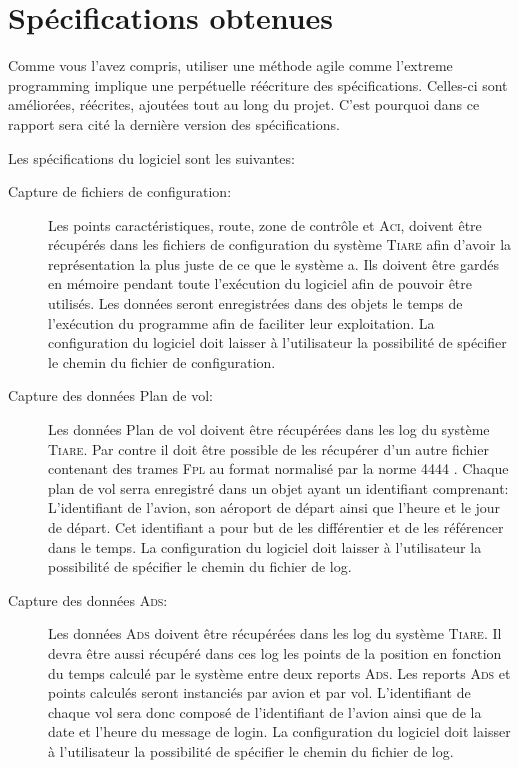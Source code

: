 
\section{Spécifications obtenues}
Comme vous l'avez compris, utiliser une méthode agile comme l'extreme programming  implique une perpétuelle réécriture des spécifications. Celles-ci sont améliorées, réécrites, ajoutées tout au long du projet. C'est pourquoi dans ce rapport sera cité la dernière version des spécifications.

Les spécifications du logiciel sont les suivantes:
\begin{description}
    \item[Capture de fichiers de configuration:] Les points caractéristiques, route, zone de contrôle et \textsc{Aci}, doivent être récupérés dans les fichiers de configuration du système \textsc{Tiare} afin d'avoir la représentation la plus juste de ce que le système a. Ils doivent être gardés en mémoire pendant toute l'exécution du logiciel afin de pouvoir être utilisés. Les données seront enregistrées dans des objets le temps de l'exécution du programme afin de faciliter leur exploitation. La configuration du logiciel doit laisser à l'utilisateur la possibilité de spécifier le chemin du fichier de configuration.

    \item[Capture des données Plan de vol:] Les données Plan de vol doivent être récupérées dans les log du système \textsc{Tiare}. Par contre il doit être possible de les récupérer d'un autre fichier contenant des trames \textsc{Fpl} au format normalisé par la norme 4444 . Chaque plan de vol serra enregistré dans un objet ayant un identifiant comprenant: L'identifiant de l'avion, son aéroport de départ ainsi que l'heure et le jour de départ. Cet identifiant a pour but de les différentier et de les référencer dans le temps. La configuration du logiciel doit laisser à l'utilisateur la possibilité de spécifier le chemin du fichier de log.

    \item[Capture des données \textsc{Ads}:] Les données \textsc{Ads} doivent être récupérées dans les log du système \textsc{Tiare}. Il devra être aussi récupéré dans ces log les points de la position en fonction du temps calculé par le système entre deux reports \textsc{Ads}. Les reports \textsc{Ads} et points calculés seront instanciés par avion et par vol. L'identifiant de chaque vol sera donc composé de l'identifiant de l'avion ainsi que de la date et l'heure du message de login. La configuration du logiciel doit laisser à l'utilisateur la possibilité de spécifier le chemin du fichier de log.


\end{description}
